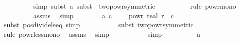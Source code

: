 \begin{isabellebody}
\ \ \ \ \ \ \ \ \isamarkupfalse%
\ {\isacharparenleft}{\kern0pt}simp{\isacharcomma}{\kern0pt}\ subst\ a{\isacharunderscore}{\kern0pt}{}{\isacharcomma}{\kern0pt}\ subst\ {\isacharparenleft}{\kern0pt}{}{\isacharparenright}{\kern0pt}\ two{\isacharunderscore}{\kern0pt}powr{\isacharunderscore}{\kern0pt}{}{\isacharbrackleft}{\kern0pt}symmetric{\isacharbrackright}{\kern0pt}{\isacharparenright}{\kern0pt}\isanewline
\ \ \ \ \ \ \ \ \isamarkupfalse%
\ {\isacharparenleft}{\kern0pt}rule\ powr{\isacharunderscore}{\kern0pt}mono{\isacharparenright}{\kern0pt}\isanewline
\ \ \ \ \ \ \ \ \isamarkupfalse%
\ assms{\isacharparenleft}{\kern0pt}{}{\isacharparenright}{\kern0pt}\ \isamarkupfalse%
\ simp{\isacharplus}{\kern0pt}\isanewline
\isanewline
\ \ \ \ \ \ \isamarkupfalse%
\ a{\isacharunderscore}{\kern0pt}{}{\isacharcolon}{\kern0pt}\ {\isachardoublequoteopen}{\isacharparenleft}{\kern0pt}c{\isacharasterisk}{\kern0pt}{}{\isacharparenright}{\kern0pt}\ {\isacharslash}{\kern0pt}\ {\isacharparenleft}{\kern0pt}{}\ {\isacharminus}{\kern0pt}\ {}\ powr\ {\isacharparenleft}{\kern0pt}{\isacharminus}{\kern0pt}real\ r{\isacharparenright}{\kern0pt}{\isacharparenright}{\kern0pt}\ {\isasymle}\ c\ {\isacharasterisk}{\kern0pt}\ {}{\isachardoublequoteclose}\ \isanewline
\ \ \ \ \ \ \ \ \isamarkupfalse%
\ {\isacharparenleft}{\kern0pt}subst\ pos{\isacharunderscore}{\kern0pt}divide{\isacharunderscore}{\kern0pt}le{\isacharunderscore}{\kern0pt}eq{\isacharcomma}{\kern0pt}\ simp{\isacharparenright}{\kern0pt}\isanewline
\ \ \ \ \ \ \ \ \ \isamarkupfalse%
\ {\isacharparenleft}{\kern0pt}subst\ two{\isacharunderscore}{\kern0pt}powr{\isacharunderscore}{\kern0pt}{}{\isacharbrackleft}{\kern0pt}symmetric{\isacharbrackright}{\kern0pt}{\isacharparenright}{\kern0pt}\isanewline
\ \ \ \ \ \ \ \ \ \isamarkupfalse%
\ {\isacharparenleft}{\kern0pt}rule\ powr{\isacharunderscore}{\kern0pt}less{\isacharunderscore}{\kern0pt}mono{\isacharparenright}{\kern0pt}\ \isamarkupfalse%
\ assms{\isacharparenleft}{\kern0pt}{}{\isacharparenright}{\kern0pt}\ \isamarkupfalse%
\ simp\isanewline
\ \ \ \ \ \ \ \ \ \isamarkupfalse%
\ simp\isanewline
\ \ \ \ \ \ \ \ \isamarkupfalse%
\ a{\isacharunderscore}{\kern0pt}{}{\isacharunderscore}{\kern0pt}{}\ \isanewline
\ \ \ \ \ \ \ \ \isamarkupfalse%

\end{isabellebody}
